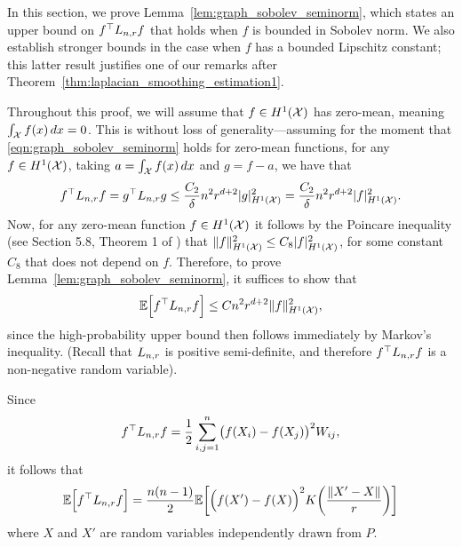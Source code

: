 In this section, we prove Lemma~\ref{lem:graph_sobolev_seminorm}, which states an upper bound on $f^{\top} L_{n,r} f$ that holds when $f$ is bounded in Sobolev norm. We also establish stronger bounds in the case when $f$ has a bounded Lipschitz constant; this latter result justifies one of our remarks after Theorem~\ref{thm:laplacian_smoothing_estimation1}. 

Throughout this proof, we will assume that $f \in H^1(\mathcal{X})$ has zero-mean, meaning $\int_{\mathcal{X}} f(x) \,dx = 0$. This is without loss of generality---assuming for the moment that \eqref{eqn:graph_sobolev_seminorm} holds for zero-mean functions, for any $f \in H^1(\mathcal{X})$, taking $a = \int_{\mathcal{X}} f(x) \,dx$ and $g = f - a$, we have that
\begin{equation*}
f^{\top} L_{n,r} f = g^{\top} L_{n,r} g \leq \frac{C_2}{\delta} n^2 r^{d + 2} |g|_{H^1(\mathcal{X})}^2 = \frac{C_2}{\delta} n^2 r^{d + 2} |f|_{H^1(\mathcal{X})}^2.
\end{equation*} 
Now, for any zero-mean function $f \in H^1(\mathcal{X})$ it follows by the Poincare inequality (see Section 5.8, Theorem 1 of \citet{evans10}) that $\|f\|_{H^1(\mathcal{X})}^2 \leq C_8 |f|_{H^1(\mathcal{X})}^2$, for some constant $C_8$ that does not depend on $f$. Therefore, to prove Lemma~\ref{lem:graph_sobolev_seminorm}, it suffices to show that
\begin{equation*}
\mathbb{E}\Bigl[f^{\top} L_{n,r} f\Bigr] \leq C n^2 r^{d + 2} \|f\|_{H^1(\mathcal{X})}^2,
\end{equation*}
since the high-probability upper bound then follows immediately by Markov's inequality. (Recall that $L_{n,r}$ is positive semi-definite, and therefore $f^{\top} L_{n,r} f$ is a non-negative random variable).

Since
\begin{equation*}
f^{\top} L_{n,r} f = \frac{1}{2}\sum_{i, j = 1}^{n} \bigl(f(X_i) - f(X_j)\bigr)^2 W_{ij},
\end{equation*}
it follows that
\begin{equation}
\label{pf:first_order_graph_sobolev_seminorm_1}
\mathbb{E}\Bigl[f^{\top} L_{n,r} f\Bigr] = \frac{n(n - 1)}{2} \mathbb{E}\biggl[\Bigl(f(X') - f(X)\Bigr)^2 K\biggl(\frac{\|X' - X\|}{r}\biggr)\biggr]
\end{equation}
where $X$ and $X'$ are random variables independently drawn from $P$.

